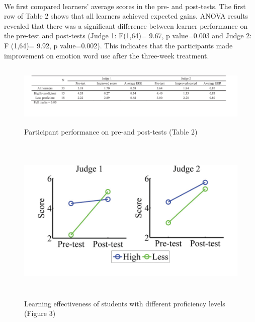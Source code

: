 \documentclass[a4paper,12pt,oneside]{article}
\let\counterwithin\relax
\begin{document}
\paragraph{}
We first compared learners’ average scores in the pre- and post-tests. The first row of Table 2 shows that all learners achieved expected gains. ANOVA results revealed that there was a significant difference between learner performance on the pre-test and post-tests (Judge 1: F(1,64)= 9.67, p value=0.003 and Judge 2: F (1,64)= 9.92, p value=0.002). This indicates that the participants made improvement on emotion word use after the three-week treatment. 

\begin{figure}[H]
\includegraphics[height=3cm,width=15cm]{Table2.png}
\centering
\caption{Participant performance on pre-and post-tests (Table 2)}
\end{figure}

\begin{figure}[H]
\includegraphics[height=8cm,width=16cm]{Figure3.png}
\centering
\caption{Learning effectiveness of students with different proficiency levels (Figure 3)}
\end{figure}
\end{document}
